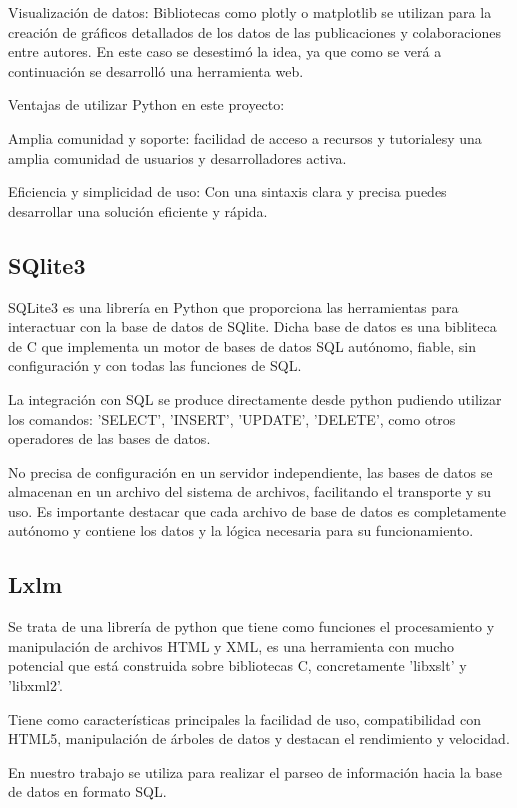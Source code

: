 \documentclass[a4paper, 12pt]{book}
\begin{document}
Visualización de datos: Bibliotecas como plotly o matplotlib se utilizan para la creación de gráficos detallados de los datos de las publicaciones y colaboraciones entre autores. En este caso se desestimó la idea, ya que como se verá a continuación se desarrolló una herramienta web.

Ventajas de utilizar Python en este proyecto:

Amplia comunidad y soporte: facilidad de acceso a recursos y tutorialesy una amplia comunidad de usuarios y desarrolladores activa.

Eficiencia y simplicidad de uso: Con una sintaxis clara y precisa puedes desarrollar una solución eficiente y rápida.

\subsection{SQlite3}

SQLite3 es una librería en Python que proporciona las herramientas para interactuar con la base de datos de SQlite. Dicha base de datos es una bibliteca de C que implementa un motor de bases de datos SQL autónomo, fiable, sin configuración y con todas las funciones de SQL.

La integración con SQL se produce directamente desde python pudiendo utilizar los comandos: 'SELECT', 'INSERT', 'UPDATE', 'DELETE', como otros operadores de las bases de datos.

No precisa de configuración en un servidor independiente, las bases de datos se almacenan en un archivo del sistema de archivos, facilitando el transporte y su uso. Es importante destacar que cada archivo de base de datos es completamente autónomo y contiene los datos y la lógica necesaria para su funcionamiento.

\subsection{Lxlm}

Se trata de una librería de python que tiene como funciones el procesamiento y manipulación de archivos HTML y XML, es una herramienta con mucho potencial que está construida sobre bibliotecas C, concretamente 'libxslt' y 'libxml2'.

Tiene como características principales la facilidad de uso, compatibilidad con HTML5, manipulación de árboles de datos y destacan el rendimiento y velocidad.

En nuestro trabajo se utiliza para realizar el parseo de información hacia la base de datos en formato SQL.
\end{document}
